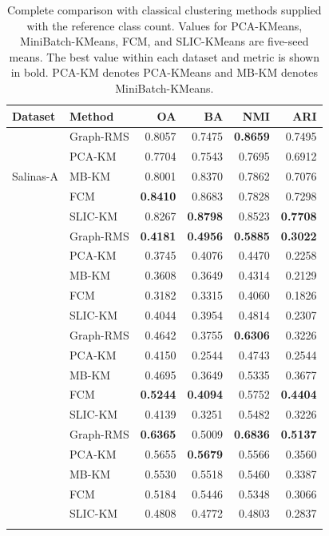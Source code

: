 \documentclass[10pt,a4paper,fleqn]{article}
\begin{document}
\begin{table}[!t]
\centering
\scriptsize
\caption{Complete comparison with classical clustering methods supplied with
the reference class count. Values for PCA-KMeans, MiniBatch-KMeans, FCM, and
SLIC-KMeans are five-seed means. The best value within each dataset and metric
is shown in bold. PCA-KM denotes PCA-KMeans and MB-KM denotes
MiniBatch-KMeans.}
\label{tab:classical_complete}

\renewcommand{\arraystretch}{0.92}
\setlength{\tabcolsep}{5pt}

\begin{tabular}{@{}llrrrr@{}}
\toprule
Dataset & Method & OA & BA & NMI & ARI \\
\midrule

\multirow{5}{*}{Salinas-A}
& Graph-RMS & 0.8057 & 0.7475 & \textbf{0.8659} & 0.7495 \\
& PCA-KM    & 0.7704 & 0.7543 & 0.7695 & 0.6912 \\
& MB-KM     & 0.8001 & 0.8370 & 0.7862 & 0.7076 \\
& FCM       & \textbf{0.8410} & 0.8683 & 0.7828 & 0.7298 \\
& SLIC-KM   & 0.8267 & \textbf{0.8798} & 0.8523 & \textbf{0.7708} \\
\addlinespace[2pt]

\multirow{5}{*}{Indian Pines}
& Graph-RMS & \textbf{0.4181} & \textbf{0.4956} & \textbf{0.5885} & \textbf{0.3022} \\
& PCA-KM    & 0.3745 & 0.4076 & 0.4470 & 0.2258 \\
& MB-KM     & 0.3608 & 0.3649 & 0.4314 & 0.2129 \\
& FCM       & 0.3182 & 0.3315 & 0.4060 & 0.1826 \\
& SLIC-KM   & 0.4044 & 0.3954 & 0.4814 & 0.2307 \\
\addlinespace[2pt]

\multirow{5}{*}{KSC}
& Graph-RMS & 0.4642 & 0.3755 & \textbf{0.6306} & 0.3226 \\
& PCA-KM    & 0.4150 & 0.2544 & 0.4743 & 0.2544 \\
& MB-KM     & 0.4695 & 0.3649 & 0.5335 & 0.3677 \\
& FCM       & \textbf{0.5244} & \textbf{0.4094} & 0.5752 & \textbf{0.4404} \\
& SLIC-KM   & 0.4139 & 0.3251 & 0.5482 & 0.3226 \\
\addlinespace[2pt]

\multirow{5}{*}{Pavia University}
& Graph-RMS & \textbf{0.6365} & 0.5009 & \textbf{0.6836} & \textbf{0.5137} \\
& PCA-KM    & 0.5655 & \textbf{0.5679} & 0.5566 & 0.3560 \\
& MB-KM     & 0.5530 & 0.5518 & 0.5460 & 0.3387 \\
& FCM       & 0.5184 & 0.5446 & 0.5348 & 0.3066 \\
& SLIC-KM   & 0.4808 & 0.4772 & 0.4803 & 0.2837 \\
\addlinespace[2pt]


\end{tabular}
\end{table}
\end{document}
